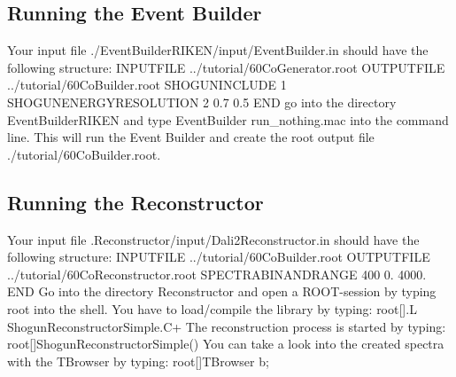 \documentclass[12pt]{book}
\begin{document}
\subsection{Running the Event Builder}
Your input file {\ttfamily ./EventBuilderRIKEN/input/EventBuilder.in} should have the following structure:\hfill{}
\linebreak
\linebreak
{\ttfamily %
  INPUTFILE ../tutorial/60CoGenerator.root\linebreak
  OUTPUTFILE ../tutorial/60CoBuilder.root\linebreak
  SHOGUNINCLUDE 1\linebreak
  SHOGUNENERGYRESOLUTION 2 0.7 0.5\linebreak
  END
}
\linebreak
\linebreak
go into the directory {\ttfamily EventBuilderRIKEN} and type\hfill{}
\linebreak
{\ttfamily
  EventBuilder run\_nothing.mac
}
\linebreak
\linebreak
into the command line. 
This will run the Event Builder and create the root output file {\ttfamily ./tutorial/60CoBuilder.root}.

\subsection{Running the Reconstructor}
Your input file {\ttfamily .Reconstructor/input/Dali2Reconstructor.in} should have the following structure:\hfill{}
\linebreak
\linebreak
{\ttfamily %
  INPUTFILE ../tutorial/60CoBuilder.root\linebreak
  OUTPUTFILE ../tutorial/60CoReconstructor.root\linebreak
  SPECTRABINANDRANGE 400 0. 4000.\linebreak
  END
}
\linebreak
\linebreak
Go into the directory {\ttfamily Reconstructor} and open a ROOT-session by typing {\ttfamily root}
into the shell. You have to load/compile the library by typing:\hfill{}
\linebreak
\linebreak
{\ttfamily
 root[].L ShogunReconstructorSimple.C+\linebreak
}
\linebreak
The reconstruction process is started by typing:\hfill{}
\linebreak
\linebreak
{\ttfamily
root[]ShogunReconstructorSimple()\linebreak
}
\linebreak
You can take a look into the created spectra with the TBrowser by typing:\hfill{}
\linebreak
\linebreak
{\ttfamily
root[]TBrowser b;\linebreak
}
\linebreak
\end{document}
